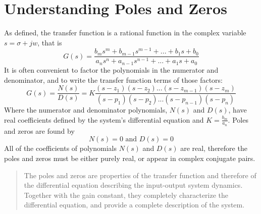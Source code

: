 \documentclass[class=report, crop=false, 12pt,a4paper, tikz, border=4mm]{standalone}
\begin{document}
\section{Understanding Poles and Zeros}
As defined, the transfer function is a rational function in the complex variable $s = \sigma + jw$, that is
\begin{equation}
  G(s)=\frac{b_ms^m + b_{m-1}s^{m-1} + ... + b_1s + b_0}{a_ns^n + a_{n-1}s^{n-1}+...+a_1s + a_0}
\end{equation}
It is often convenient to factor the polynomials in the numerator and denominator, and to write the transfer function terms of those factors:
\begin{equation}
  G(s) = \frac{N(s)}{D(s)} = K \frac{(s-z_1)(s-z_2)...(s-z_{m-1})(s-z_m)}{(s-p_1)(s-p_2)...(s-p_{n-1})(s-p_n)}
\end{equation}
Where the numerator and denominator polynomials, $N(s)$ and $D(s)$, have real coefficients defined by the system's differential equation and $K = \frac{b_m}{a_n}$. Poles and zeros are found by
\begin{equation}
  N(s) = 0 \textrm{ and } D(s) = 0
\end{equation}
All of the coefficients of polynomials $N(s)$ and $D(s)$ are real, therefore  the poles and zeros must be either purely real, or appear in complex conjugate pairs.
\begin{quotation}
  The poles and zeros are properties of the transfer function and therefore of the differential equation describing the input-output system dynamics. Together with the gain constant, they completely characterize the differential equation, and provide a complete description of the system.
\end{quotation}
\end{document}
